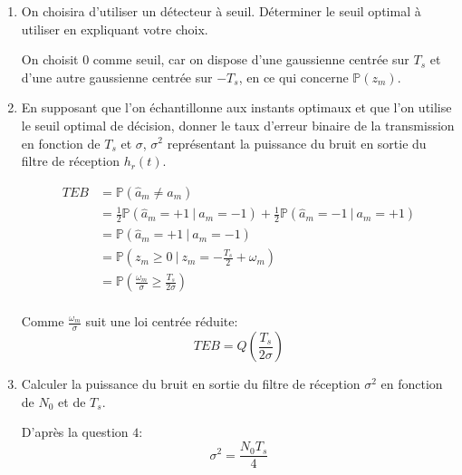 \documentclass[frenchb]{article}
\begin{document}
\begin{enumerate}
        \item On choisira d'utiliser un détecteur à seuil. Déterminer le seuil optimal à utiliser en expliquant votre choix.
        
        \par\leavevmode\par
        \setlength\parindent{0.5cm}
        On choisit 0 comme seuil, car on dispose d'une gaussienne centrée sur $T_s$ et d'une autre gaussienne centrée sur $- T_s$, en ce qui concerne $\mathbb{P}(z_m)$.
        \par\leavevmode\par
        \item En supposant que l'on échantillonne aux instants optimaux et que l'on utilise le seuil optimal de décision, donner le taux d'erreur binaire de la transmission en fonction de $T_s$ et $\sigma$, $\sigma^2$ représentant la puissance du bruit en sortie du filtre de réception $h_r(t)$.
        
        \par\leavevmode\par
        \begin{equation*}
        \begin{split}
        TEB & = \mathbb{P}(\hat{a}_m \ne a_m) \\
        & = \frac{1}{2} \mathbb{P}\left(\hat{a}_m = + 1 \ | \ a_m = -1\right) + \frac{1}{2} \mathbb{P}\left(\hat{a}_m = - 1 \ | \ a_m = +1\right) \\
        & = \mathbb{P}\left(\hat{a}_m = + 1 \ | \ a_m = -1\right) \\
        & = \mathbb{P}\left(z_m \geq 0 \ | \ z_m = -\frac{T_s}{2} + \omega_m\right) \\
        & = \mathbb{P}\left(\frac{\omega_m}{\sigma} \geq \frac{T_s}{2 \sigma}\right) \\
        \end{split}
        \end{equation*}
        
        Comme $\frac{\omega_m}{\sigma}$ suit une loi centrée réduite: 
        $$\boxed{TEB = Q\left(\frac{T_s}{2 \sigma}\right)}$$
        
        \item Calculer la puissance du bruit en sortie du filtre de réception $\sigma^2$ en fonction de $N_0$ et de $T_s$.
        \par\leavevmode\par
        D'après la question $4$: 
        $$\boxed{\sigma^2 = \frac{N_0 T_s}{4}}$$
        \par\leavevmode\par
        

\end{enumerate}
\end{document}
